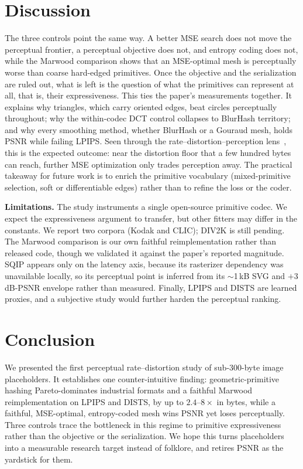 \documentclass[11pt]{article}
\begin{document}
\section{Discussion}
The three controls point the same way. A better MSE search does not move the
perceptual frontier, a perceptual objective does not, and entropy coding does
not, while the Marwood comparison shows that an MSE-optimal mesh is perceptually
worse than coarse hard-edged primitives. Once the objective and the
serialization are ruled out, what is left is the question of what the primitives
can represent at all, that is, their expressiveness. This ties the paper's
measurements together. It explains why triangles, which carry oriented edges,
beat circles perceptually throughout; why the within-codec DCT control collapses
to BlurHash territory; and why every smoothing method, whether BlurHash or a
Gouraud mesh, holds PSNR while failing LPIPS. Seen through the
rate--distortion--perception lens~\cite{rdp}, this is the expected outcome: near
the distortion floor that a few hundred bytes can reach, further MSE
optimization only trades perception away. The practical takeaway for future work
is to enrich the primitive vocabulary (mixed-primitive selection, soft or
differentiable edges) rather than to refine the loss or the coder.

\textbf{Limitations.} The study instruments a single open-source primitive
codec. We expect the expressiveness argument to transfer, but other fitters may
differ in the constants. We report two corpora (Kodak and CLIC); DIV2K is still
pending. The Marwood comparison is our own faithful reimplementation rather than
released code, though we validated it against the paper's reported magnitude.
SQIP appears only on the latency axis, because its rasterizer dependency was
unavailable locally, so its perceptual point is inferred from its $\sim$1\,kB
SVG and $+3$\,dB-PSNR envelope rather than measured. Finally, LPIPS and DISTS are
learned proxies, and a subjective study would further harden the perceptual
ranking.

\section{Conclusion}
We presented the first perceptual rate--distortion study of sub-300-byte image
placeholders. It establishes one counter-intuitive finding: geometric-primitive
hashing Pareto-dominates industrial formats and a faithful
Marwood~\cite{marwood} reimplementation on LPIPS and DISTS, by up to
$2.4$--$8\times$ in bytes, while a faithful, MSE-optimal, entropy-coded mesh wins
PSNR yet loses perceptually. Three controls trace the bottleneck in this regime
to primitive expressiveness rather than the objective or the serialization. We
hope this turns placeholders into a measurable research target instead of
folklore, and retires PSNR as the yardstick for them.
\end{document}
